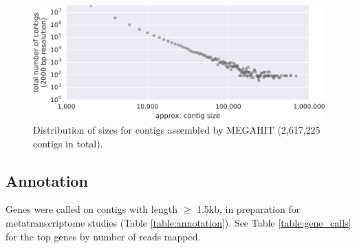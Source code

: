 \begin{figure}[H]
\centering
    \includegraphics[width=1.0\textwidth]{./tex/chapter2/figures/170123_frac_reads_binned_at_different_contig_lengths_and_total--INKSCAPED.pdf}
    \begin{singlespace}
    \caption[Distribution of contig sizes]{
        Distribution of sizes for contigs assembled by MEGAHIT (2,617,225 contigs in total).}
    \label{fig:contig_lengths}
    \end{singlespace}
\end{figure}



\subsection{Annotation}



Genes were called on contigs with length $\geq$ 1.5kb, in preparation for metatranscriptome studies (Table \ref{table:annotation}).
See Table \ref{table:gene_calls} for the top genes by number of reads mapped.

